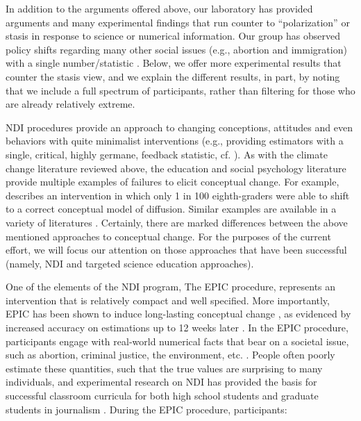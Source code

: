 In addition to the arguments offered above, our laboratory has provided
arguments and many experimental findings that run counter to ``polarization'' or
stasis in response to science or numerical information.  Our group has observed
policy shifts regarding many other social issues (e.g., abortion and
immigration) with a single number/statistic
\parencite{garcia_de_osuna_qualitative_2004,munnich_policy_2003,ranney_designing_2008}.
Below, we offer more experimental results that counter the stasis view, and we
explain the different results, in part, by noting that we include a full
spectrum of participants, rather than filtering for those who are already
relatively extreme.


NDI procedures \parencite[introduced by][]{ranney_numerically_2001_fixed} provide an
approach to changing conceptions, attitudes and even behaviors with quite
minimalist interventions (e.g., providing estimators with a single, critical,
highly germane, feedback statistic, cf. ). As
with the climate change literature reviewed above, the
education and social psychology literature provide multiple examples of failures
to elicit conceptual change. For example, \textcite{chi_commonsense_2005} describes
an intervention in which only 1 in 100 eighth-graders were able to shift to a
correct conceptual model of diffusion. Similar examples are available in a
variety of literatures \parencite[cf.][]{disessa_what_1998, lord_biased_1979}.
Certainly, there are marked differences between the above mentioned approaches to
conceptual change. For the purposes of the current effort, we will focus our
attention on those approaches that have been successful (namely, NDI and
targeted science education approaches).

One of the elements of the NDI program, The EPIC procedure, represents an
intervention that is relatively compact and well specified. More importantly,
EPIC has been shown to induce long-lasting conceptual change
\parencite[e.g.,][]{ranney_designing_2008}, as evidenced by increased accuracy on estimations
up to 12 weeks later \parencite{munnich_longevities_2005}.  In the EPIC procedure,
participants engage with real-world numerical facts that bear on a societal
issue, such as abortion, criminal justice, the environment, etc.
\parencite[e.g.,][]{garcia_de_osuna_qualitative_2004,munnich_policy_2003}.  
People often poorly
estimate these quantities, such that the true values are surprising to many
individuals, and experimental research on NDI has provided the basis for
successful classroom curricula for both high school students and graduate
students in journalism
\parencite{munnich_numerically-driven_2004,ranney_designing_2008}.  During the EPIC
procedure, participants:

